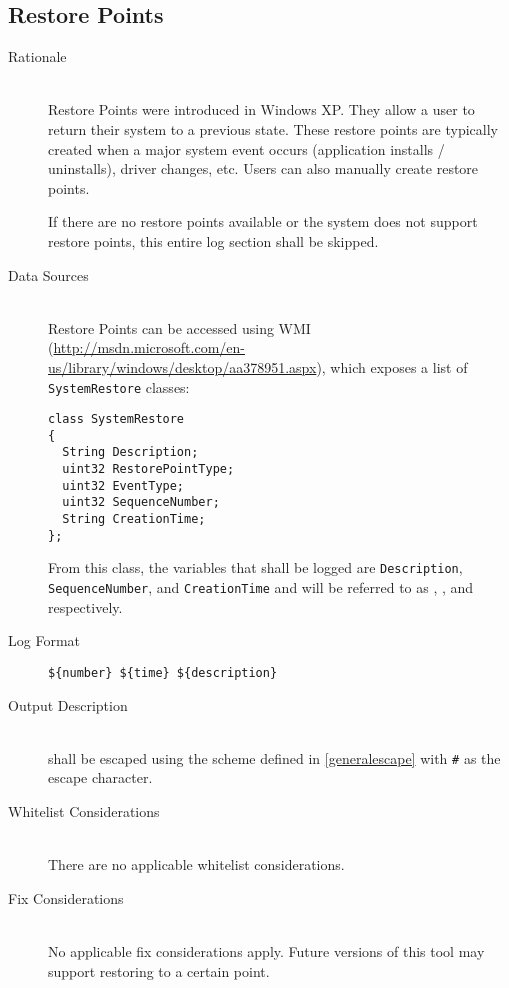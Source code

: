 \subsection{Restore Points}
\begin{description}
\item[Rationale] \hfill \\
Restore Points were introduced in Windows XP.  They allow a user to return their
system to a previous state.  These restore points are typically created when a
major system event occurs (application installs / uninstalls), driver changes,
etc.  Users can also manually create restore points. 

If there are no restore points available or the system does not support restore
points, this entire log section shall be skipped.
\item[Data Sources] \hfill \\
Restore Points can be accessed using WMI
(\url{http://msdn.microsoft.com/en-us/library/windows/desktop/aa378951.aspx}),
which exposes a list of \texttt{SystemRestore} classes:
\vspace{-\baselineskip}
\begin{verbatim}
class SystemRestore
{
  String Description;
  uint32 RestorePointType;
  uint32 EventType;
  uint32 SequenceNumber;
  String CreationTime;
};
\end{verbatim}
From this class, the variables that shall be logged are \texttt{Description},
\texttt{SequenceNumber}, and \texttt{CreationTime} and will be referred to as
, , and  respectively.
\item[Log Format] \hfill
\vspace{-\baselineskip}
\begin{verbatim}
${number} ${time} ${description}
\end{verbatim}
\item[Output Description] \hfill \\
 shall be escaped using the scheme defined in
\ref{generalescape} with \verb|#| as the escape character.  
\item[Whitelist Considerations] \hfill \\
There are no applicable whitelist considerations.
\item[Fix Considerations] \hfill \\
No applicable fix considerations apply.  Future versions of this tool may
support restoring to a certain point.  
\end{description}

